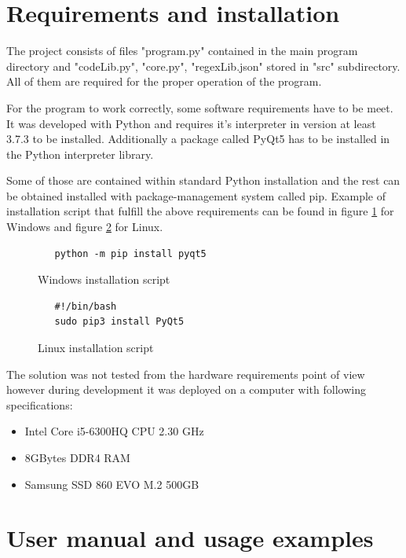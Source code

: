 \documentclass[a4paper,twoside,12pt]{book}
\begin{document}
\section{Requirements and installation}

The project consists of files "program.py" contained in the main program directory and
"codeLib.py", "core.py", "regexLib.json" stored in "src" subdirectory. All of them are 
required for the proper operation of the program.

For the program to work correctly, some software requirements have to be meet. It was developed with 
Python and requires it's interpreter in version at least 3.7.3 to be installed. Additionally a package called PyQt5 has 
to be installed in the Python interpreter library.

Some of those are contained within standard Python installation and the rest can be obtained installed with package-management 
system called pip. Example of installation script that fulfill the above requirements can be found
in figure \ref{fig:windowsScript} for Windows and figure \ref{fig:linuxScript} for Linux.

\begin{figure}
   \centering
   \begin{lstlisting}
   python -m pip install pyqt5
   \end{lstlisting}
   \caption{Windows installation script}
   \label{fig:windowsScript}
\end{figure}

\begin{figure}
   \centering
   \begin{lstlisting}
   #!/bin/bash
   sudo pip3 install PyQt5
   \end{lstlisting}
   \caption{Linux installation script}
   \label{fig:linuxScript}
\end{figure}

The solution was not tested from the hardware requirements point of view however 
during development it was deployed on a computer with following specifications:

\begin{itemize}
   \item Intel Core i5-6300HQ CPU 2.30 GHz
   \item 8GBytes DDR4 RAM
   \item Samsung SSD 860 EVO M.2 500GB
\end{itemize}

\section{User manual and usage examples}
\end{document}
